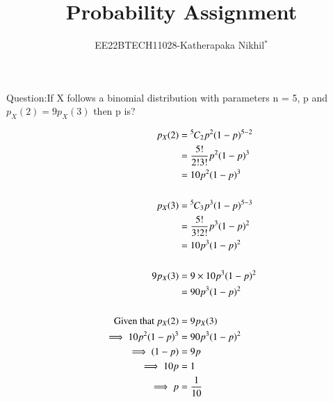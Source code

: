 \documentclass[journal,12pt,twocolumn]{IEEEtran}
\theoremstyle{remark}
\begin{document}

\vspace{3cm}

\title{Probability Assignment}
\author{EE22BTECH11028-Katherapaka Nikhil$^{*}$%
}
\maketitle
\newpage
\bigskip
\renewcommand{\thefigure}{\theenumi}
\renewcommand{\thetable}{\theenumi}

Question:If X follows a binomial distribution with parameters n = 5, p and
$p_X(2) = 9p_X(3)$
then p is?


\solution
\begin{align}
p_X(2) &= {{}^{5}\mkern-1muC_{2}} p^2 (1 - p)^{5 - 2}\\
&= \frac{5!}{2!3!} p^2 (1 - p)^3\\
&= 10 p^2 (1 - p)^3\\
\\
p_X(3) &= {{}^{5}\mkern-1muC_{3}} p^3 (1 - p)^{5 - 3}\\
&= \frac{5!}{3!2!} p^3 (1 - p)^2\\
&= 10 p^3 (1 - p)^2\\
\\
9p_X(3) &= 9 \times 10 p^3 (1 - p)^2\\
&= 90 p^3 (1 - p)^2\\
\\
\text{Given that } p_X(2) &= 9p_X(3)\\
\implies 10 p^2 (1 - p)^3 &= 90 p^3 (1 - p)^2\\
\implies (1 - p) &= 9p\\
\implies 10p &=1 \\
\implies p&=\frac{1}{10}
\end{align}
\end{document}
